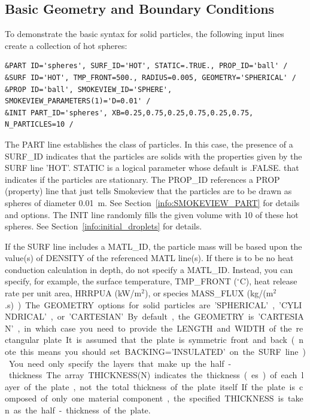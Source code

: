 \documentclass[11pt]{book}
\begin{document}
\subsection{Basic Geometry and Boundary Conditions}
\label{info:PART_GEOMETRY}

To demonstrate the basic syntax for solid particles, the following input lines create a collection of hot spheres:
\begin{lstlisting}
&PART ID='spheres', SURF_ID='HOT', STATIC=.TRUE., PROP_ID='ball' /
&SURF ID='HOT', TMP_FRONT=500., RADIUS=0.005, GEOMETRY='SPHERICAL' /
&PROP ID='ball', SMOKEVIEW_ID='SPHERE', SMOKEVIEW_PARAMETERS(1)='D=0.01' /
&INIT PART_ID='spheres', XB=0.25,0.75,0.25,0.75,0.25,0.75, N_PARTICLES=10 /
\end{lstlisting}
The {\ct PART} line establishes the class of particles. In this case, the presence of a {\ct SURF\_ID} indicates that the particles are solids with the properties given by the {\ct SURF} line {\ct 'HOT'}. {\ct STATIC} is a logical parameter whose default is {\ct .FALSE.} that indicates if the particles are stationary. The {\ct PROP\_ID} references a {\ct PROP} (property) line that just tells Smokeview that the particles are to be drawn as spheres of diameter 0.01~m. See Section~\ref{info:SMOKEVIEW_PART} for details and options. The {\ct INIT} line randomly fills the given volume with 10 of these hot spheres. See Section~\ref{info:initial_droplets} for details.

If the {\ct SURF} line includes a {\ct MATL\_ID}, the particle mass will be based upon the value(s) of {\ct DENSITY} of the referenced {\ct MATL} line(s). If there is to be no heat conduction calculation in depth, do not specify a {\ct MATL\_ID}. Instead, you can specify, for example, the surface temperature, {\ct TMP\_FRONT} ($^\circ$C), heat release rate per unit area, {\ct HRRPUA} (kW/m$^2$), or species {\ct MASS\_FLUX} (\si{kg/(m$^2$.s)}).

The {\ct GEOMETRY} options for solid particles are {\ct 'SPHERICAL'}, {\ct 'CYLINDRICAL'}, or {\ct 'CARTESIAN'}.
By default, the {\ct GEOMETRY} is {\ct 'CARTESIAN'}, in which case you need to provide the {\ct LENGTH} and {\ct WIDTH} of the rectangular plate. It is assumed that the plate is symmetric front and back (note this means you should set {\ct BACKING='INSULATED'} on the {\ct SURF} line). You need only specify the layers that make up the half-thickness. The array {\ct THICKNESS(N)} indicates the thickness(es) of each layer of the plate, not the total thickness of the plate itself. If the plate is composed of only one material component, the specified {\ct THICKNESS} is taken as the half-thickness of the plate.
\end{document}
